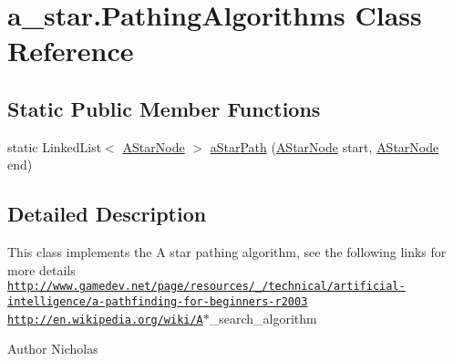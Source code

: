 \hypertarget{classa__star_1_1_pathing_algorithms}{\section{a\-\_\-star.\-Pathing\-Algorithms Class Reference}
\label{classa__star_1_1_pathing_algorithms}
}
\subsection*{Static Public Member Functions}
\begin{DoxyCompactItemize}
\item 
static Linked\-List$<$ \hyperlink{classa__star_1_1_a_star_node}{A\-Star\-Node} $>$ \hyperlink{classa__star_1_1_pathing_algorithms_acb3c862843903d83cc1c5faaf81ade91}{a\-Star\-Path} (\hyperlink{classa__star_1_1_a_star_node}{A\-Star\-Node} start, \hyperlink{classa__star_1_1_a_star_node}{A\-Star\-Node} end)
\end{DoxyCompactItemize}


\subsection{Detailed Description}
This class implements the A star pathing algorithm, see the following links for more details \href{http://www.gamedev.net/page/resources/_/technical/artificial-intelligence/a-pathfinding-for-beginners-r2003}{\tt http\-://www.\-gamedev.\-net/page/resources/\-\_\-/technical/artificial-\/intelligence/a-\/pathfinding-\/for-\/beginners-\/r2003} \href{http://en.wikipedia.org/wiki/A}{\tt http\-://en.\-wikipedia.\-org/wiki/\-A}$\ast$\-\_\-search\-\_\-algorithm

\begin{DoxyAuthor}{Author}
Nicholas 
\end{DoxyAuthor}


